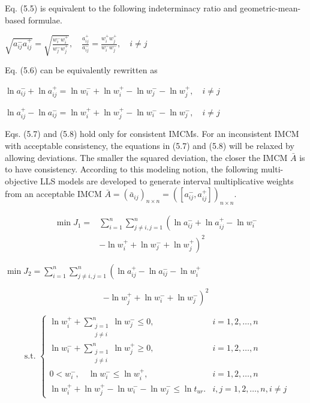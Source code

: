 \documentclass[10pt]{article}
\begin{document}
Eq. (5.5) is equivalent to the following indeterminacy ratio and geometric-mean-based formulae.

$\sqrt{a_{i j}^{-} a_{i j}^{+}}=\sqrt{\frac{w_{i}^{-} w_{i}^{+}}{w_{j}^{-} w_{j}^{+}}}, \quad \frac{a_{i j}^{+}}{a_{i j}^{-}}=\frac{w_{i}^{+} w_{j}^{+}}{w_{i}^{-} w_{j}^{-}}, \quad i \neq j$

Eq. (5.6) can be equivalently rewritten as

$\ln a_{i j}^{-}+\ln a_{i j}^{+}=\ln w_{i}^{-}+\ln w_{i}^{+}-\ln w_{j}^{-}-\ln w_{j}^{+}, \quad i \neq j$

$\ln a_{i j}^{+}-\ln a_{i j}^{-}=\ln w_{i}^{+}+\ln w_{j}^{+}-\ln w_{i}^{-}-\ln w_{j}^{-}, \quad i \neq j$

Eqs. (5.7) and (5.8) hold only for consistent IMCMs. For an inconsistent IMCM with acceptable consistency, the equations in (5.7) and (5.8) will be relaxed by allowing deviations. The smaller the squared deviation, the closer the IMCM $\bar{A}$ is to have consistency. According to this modeling notion, the following multi-objective LLS models are developed to generate interval multiplicative weights from an acceptable IMCM $\bar{A}=\left(\bar{a}_{i j}\right)_{n \times n}=\left(\left[a_{i j}^{-}, a_{i j}^{+}\right]\right)_{n \times n}$.

$$
\begin{aligned}
\min J_{1}= & \sum_{i=1}^{n} \sum_{j \neq i, j=1}^{n}\left(\ln a_{i j}^{-}+\ln a_{i j}^{+}-\ln w_{i}^{-}\right. \\
& \left.-\ln w_{i}^{+}+\ln w_{j}^{-}+\ln w_{j}^{+}\right)^{2}
\end{aligned}
$$

$\min J_{2}=\sum_{i=1}^{n} \sum_{j \neq i, j=1}^{n}\left(\ln a_{i j}^{+}-\ln a_{i j}^{-}-\ln w_{i}^{+}\right.$

$$
\left.-\ln w_{j}^{+}+\ln w_{i}^{-}+\ln w_{j}^{-}\right)^{2}
$$

$$
\text { s.t. } \begin{cases}\ln w_{i}^{+}+\sum_{\substack{j=1 \\ j \neq i}}^{n} \ln w_{j}^{-} \leq 0, & i=1,2, \ldots, n \\ \ln w_{i}^{-}+\sum_{\substack{j=1 \\ j \neq i}}^{n} \ln w_{j}^{+} \geq 0, & i=1,2, \ldots, n \\ 0<w_{i}^{-}, \quad \ln w_{i}^{-} \leq \ln w_{i}^{+}, & i=1,2, \ldots, n \\ \ln w_{i}^{+}+\ln w_{j}^{+}-\ln w_{i}^{-}-\ln w_{j}^{-} \leq \ln t_{u r} . & i, j=1,2, \ldots, n, i \neq j\end{cases}
$$
\end{document}
